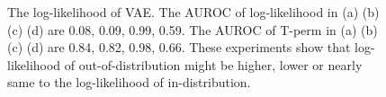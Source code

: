 \documentclass[letterpaper]{article} %
\begin{document}
\begin{figure}[t]
\centering
{}
\quad
{}
\caption{The log-likelihood of VAE. The AUROC of log-likelihood in (a) (b) (c) (d) are 0.08, 0.09, 0.99, 0.59. The AUROC of T-perm in (a) (b) (c) (d) are 0.84, 0.82, 0.98, 0.66. These experiments show that log-likelihood of out-of-distribution might be higher, lower or nearly same to the log-likelihood of in-distribution.}
\label{fig1}
\end{figure}
\end{document}
